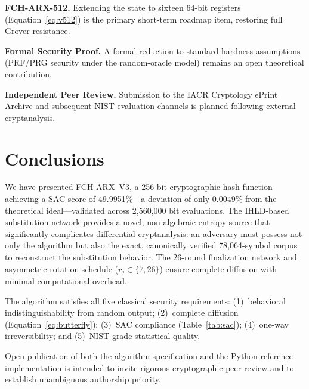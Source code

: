 \documentclass[12pt,journal]{IEEEtran}
\begin{document}
\textbf{FCH-ARX-512.}
Extending the state to sixteen 64-bit registers (Equation~\eqref{eq:v512})
is the primary short-term roadmap item, restoring full Grover resistance.

\textbf{Formal Security Proof.}
A formal reduction to standard hardness assumptions (PRF/PRG security under
the random-oracle model) remains an open theoretical contribution.

\textbf{Independent Peer Review.}
Submission to the IACR Cryptology ePrint Archive and subsequent NIST
evaluation channels is planned following external cryptanalysis.

\section{Conclusions}

We have presented FCH-ARX~V3, a 256-bit cryptographic hash function achieving
a SAC score of 49.9951\%---a deviation of only 0.0049\% from the theoretical
ideal---validated across 2{,}560{,}000 bit evaluations. The IHLD-based
substitution network provides a novel, non-algebraic entropy source that
significantly complicates differential cryptanalysis: an adversary must
possess not only the algorithm but also the exact, canonically verified
78{,}064-symbol corpus to reconstruct the substitution behavior. The 26-round
finalization network and asymmetric rotation schedule ($r_j \in \{7, 26\}$)
ensure complete diffusion with minimal computational overhead.

The algorithm satisfies all five classical security requirements:
(1)~behavioral indistinguishability from random output;
(2)~complete diffusion (Equation~\eqref{eq:butterfly});
(3)~SAC compliance (Table~\ref{tab:sac});
(4)~one-way irreversibility;
and (5)~NIST-grade statistical quality.

Open publication of both the algorithm specification and the Python reference
implementation is intended to invite rigorous cryptographic peer review and to
establish unambiguous authorship priority.
\end{document}
